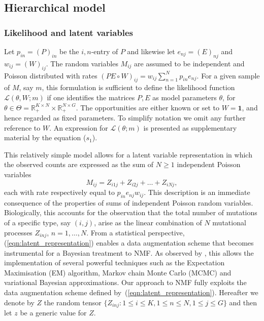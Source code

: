 \documentclass{bioinfo}
\begin{document}
\subsection{Hierarchical model}
\subsubsection{Likelihood and latent variables}
Let $p_{in} = (P)_{in}$ be the $i,n$-entry of $P$ and likewise let
$e_{nj} = (E)_{nj}$ and $w_{ij} = (W)_{ij}$.  The random variables
$M_{ij}$ are assumed to be independent and Poisson distributed with
rates 
$
  (PE\circ W)_{ij} = w_{ij}\sum_{n=1}^N p_{in}e_{nj}.
$
For a given sample of $M$, say $m$, this formulation is sufficient to
define the likelihood function $\mathcal L(\theta, W; m)$ if one
identifies the matrices $P, E$ as model parameters $\theta$, for
$\theta \in \Theta = \mathbb R_+^{K\times N}\times \mathbb
R_+^{N\times G}$. The opportunities are either known or set to $W =
\mathbf{1}$, and hence regarded as fixed parameters. To simplify
notation we omit any further reference to $W$. An expression for
$\mathcal L(\theta; m)$ is presented as supplementary material by the
equation ($s_1$).

This relatively simple model allows for a latent variable
representation in which the observed counts are expressed as the sum
of $N\geq 1$ independent Poisson variables
\begin{equation}
  \label{eqn:latent_representation}
   M_{ij} = Z_{i1j} + Z_{i2j} + \ldots + Z_{iNj},
\end{equation} 
each with rate respectively equal to $p_{in}e_{nj}w_{ij}$. This
description is an immediate consequence of the properties of sums of
independent Poisson random variables. Biologically, this accounts for
the observation that the total number of mutations of a specific type,
say $(i,j)$, arise as the linear combination of $N$ mutational
processes $Z_{inj}$, $n = 1, \ldots, N$. From a statistical
perspective, (\ref{eqn:latent_representation}) enables a data
augmentation scheme that becomes instrumental for a Bayesian treatment
to NMF. As observed by \cite{C}, this allows the implementation of
several powerful techniques such as the Expectation Maximisation (EM)
algorithm, Markov chain Monte Carlo (MCMC) and variational Bayesian
approximations.  Our approach to NMF fully exploits the data
augmentation scheme defined by~(\ref{eqn:latent_representation}).
Hereafter we denote by $Z$ the random tensor $\{Z_{inj}: 1\leq i\leq
K, 1\leq n \leq N, 1\leq j\leq G\}$ and then let $z$ be a generic
value for $Z$.
\end{document}

